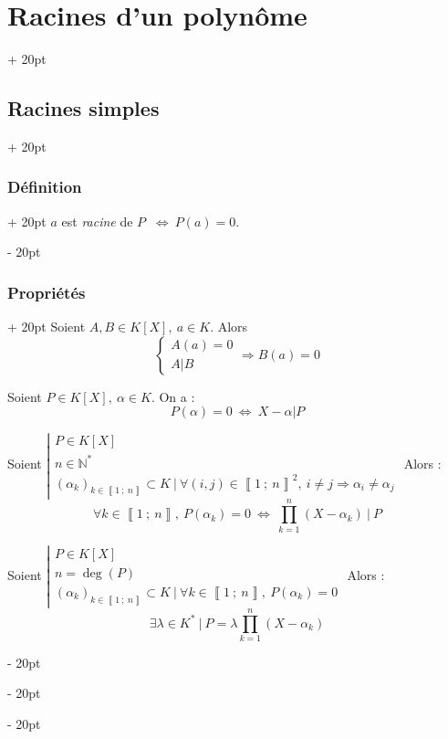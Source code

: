 \documentclass[a4paper, 12pt, twoside]{article}
\newcommand{\N}{\mathbb{N}} %
\newcommand{\nset}[2]{\left\llbracket #1\ ;\ #2 \right\rrbracket}
\newcommand{\ssi}{\ \Leftrightarrow \ }
\newcommand{\eqsys}[2]{\begin{cases} #1 \\ #2 \end{cases}}
\newcommand{\ind}[1][20pt]{\advance\leftskip + #1}
\newcommand{\deind}[1][20pt]{\advance\leftskip - #1}
\newenvironment{indt}[2][20pt]{#2 \par \ind[#1]}{\par \deind} %
\begin{document}
\begin{indt}{\section{Racines d'un polynôme}}
\begin{indt}{\subsection{Racines simples}}
\begin{indt}{\subsubsection{Définition}}
                $a$ est \textit{racine} de $P$ $\ssi P(a) = 0$.
            \end{indt}
            
            \vspace{6pt}
            
            \begin{indt}{\subsubsection{Propriétés}}
                Soient $A, B \in K[X],\ a \in K$. Alors
                    \[ \eqsys{A(a) = 0}{A|B} \Rightarrow B(a) = 0 \]
                
                \vspace{6pt}
                
                Soient $P \in K[X],\ \alpha \in K$. On a :
                    \[ P(\alpha) = 0 \ssi X - \alpha | P \]
                
                \vspace{6pt}
                
                Soient
                $
                    \left|
                    \begin{array}{l}
                        P \in K[X]
                        \\
                        n \in \N^*
                        \\
                        (\alpha_k)_{k \in \nset 1 n} \subset K\ |\ \forall (i, j) \in \nset{1}{n}^2,\ i \neq j \Rightarrow \alpha_i \neq \alpha_j
                    \end{array}
                    \right.
                $
                Alors :
                    \[ \forall k \in \nset 1 n,\ P(\alpha_k) = 0 \ssi \prod_{k = 1}^n (X - \alpha_k) \ |\ P \]
                
                \vspace{6pt}
                
                Soient
                $
                    \left|
                    \begin{array}{l}
                        P \in K[X]
                        \\
                        n = \deg(P)
                        \\
                        (\alpha_k)_{k \in \nset 1 n} \subset K\ |\ \forall k \in \nset 1 n,\ P(\alpha_k) = 0
                    \end{array}
                    \right.
                $
                Alors :
                    \[ \exists \lambda \in K^*\ |\ P = \lambda \prod_{k = 1}^n (X - \alpha_k) \]
            \end{indt}
        \end{indt}
        

\end{indt}
\end{document}
